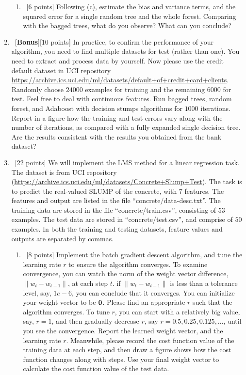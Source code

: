 \documentclass[12pt, fullpage,letterpaper]{article}
\begin{document}
\begin{enumerate}
\begin{enumerate}
	\item~[6 points] Following (c), estimate the bias and variance terms, and the squared error for a single random tree and the whole forest.  Comparing with the bagged trees, what do you observe? What can you conclude? 
\end{enumerate}

\item~[\textbf{Bonus}][10 points] In practice, to confirm the performance of your algorithm, you need to find multiple datasets for test (rather than one). You need to extract and process data by yourself. Now please use the credit default dataset in UCI repository \href{https://archive.ics.uci.edu/ml/datasets/default+of+credit+card+clients}{https://archive.ics.uci.edu/ml/datasets/default+of+credit+card+clients}. Randomly choose $24000$ examples for training and the remaining $6000$ for test. Feel free to deal with continuous features. Run bagged trees, random forest, and Adaboost with decision stumps algorithms for $1000$ iterations. Report in a figure how the training and test errors vary along with the number of iterations, as compared with a fully expanded single decision tree. Are the results consistent with the results you obtained from the bank dataset?

	\item~[22 points] We will implement the LMS method for a linear regression task. The dataset is from UCI repository (\url{https://archive.ics.uci.edu/ml/datasets/Concrete+Slump+Test}). The task is to predict the real-valued SLUMP of the concrete, with $7$ features. The features and output are listed in the file ``concrete/data-desc.txt''. The training data are stored in the file ``concrete/train.csv'', consisting of $53$ examples. The test data are stored in ``concrete/test.csv'', and comprise of $50$ examples. In both the training and testing datasets, feature values and outputs are separated by commas. 
	
	\begin{enumerate}
		\item~[8 points] Implement the batch gradient descent algorithm, and tune the learning rate $r$ to ensure the algorithm converges.  To examine convergence, you can watch the norm of the weight vector difference,  $\|w_{t} - w_{t-1}\|$,  at each step $t$.  if $\|w_{t} - w_{t-1}\|$ is  less than a tolerance level, say, $1e-6$, you can conclude that it converges. You can initialize your weight vector to be ${\bf 0}$.  Please find an appropriate $r$ such that the algorithm converges. To tune $r$, you can start with a relatively big value, say, $r=1$, and then gradually decrease $r$, say $r=0.5, 0.25, 0.125, \ldots$, until you see the convergence. 
		Report the learned weight vector, and the learning rate $r$. Meanwhile, please record the cost function  value of the training data at each step, and then draw a figure shows how the cost function changes along with steps. Use your final weight vector to calculate  the cost function value of the test data. 
		

\end{enumerate}
\end{enumerate}
\end{document}
